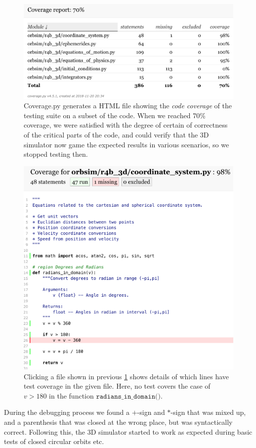 \begin{figure}[ht]
    \centering
    \includegraphics[width=0.90\linewidth]{fig/Coverage-py.png}
    \caption{Coverage.py generates a HTML file showing the \emph{code coverage} of the testing suite on a subset of the code. When we reached 70\% coverage, we were satisfied with the degree of certain of correctness of the critical parts of the code, and could verify that the 3D simulator now game the expected results in various scenarios, so we stopped testing then.}
    \label{fig:Coverage-py}
\end{figure}

\begin{figure}[ht]
    \centering
    \includegraphics[width=0.90\linewidth]{fig/Coverage-py-file.png}
    \caption{Clicking a file shown in previous \cref{fig:Coverage-py} shows details of which lines have test coverage in the given file. Here, no test covers the case of $v > 180$ in the function $\texttt{radians\_in\_domain().}$}
    \label{fig:Coverage-py-file}
\end{figure}

During the debugging process we found a $+$-sign and $*$-sign that was mixed up, and a parenthesis that was closed at the wrong place, but was syntactically correct. Following this, the 3D simulator started to work as expected during basic tests of closed circular orbits etc.